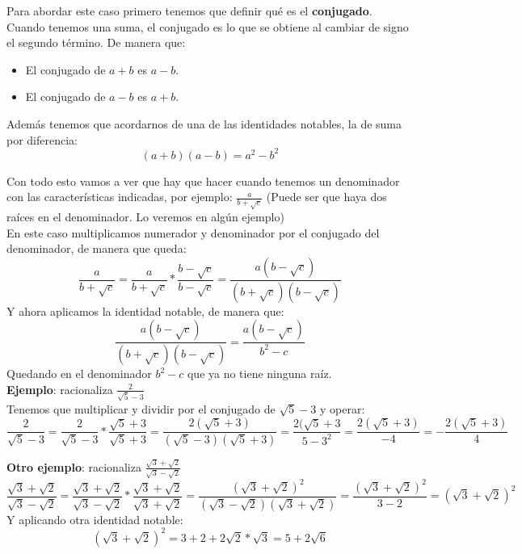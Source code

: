 \documentclass[a4paper,11pt,answers]{exam}
\begin{document}
Para abordar este caso primero tenemos que definir qué es el \textbf{conjugado}.\\
Cuando tenemos una suma, el conjugado es lo que se obtiene al cambiar de signo el segundo término. De manera que:
\begin{itemize}
	\item El conjugado de $a+b$ es $a-b$.
	\item El conjugado de $a-b$ es $a+b$.
\end{itemize}

Además tenemos que acordarnos de una de las identidades notables, la de suma por diferencia:
\[(a+b)(a-b) = a^2 - b^2\]

Con todo esto vamos a ver que hay que hacer cuando tenemos un denominador con las características indicadas, por ejemplo: $\frac{a}{b + \sqrt{c}}$ (Puede ser que haya dos raíces en el denominador. Lo veremos en algún ejemplo)\\
En este caso multiplicamos numerador y denominador por el conjugado del denominador, de manera que queda:
\[\frac{a}{b + \sqrt{c}} = \frac{a}{b + \sqrt{c}} * \frac{b-\sqrt{c}}{b-\sqrt{c}} = \frac{a(b-\sqrt{c})}{(b+\sqrt{c})(b-\sqrt{c})}\]
Y ahora aplicamos la identidad notable, de manera que:
\[\frac{a(b-\sqrt{c})}{(b+\sqrt{c})(b-\sqrt{c})} = \frac{a(b-\sqrt{c})}{b^2 - c}\]
Quedando en el denominador $b^2 - c$ que ya no tiene ninguna raíz.\\

\textbf{Ejemplo}: racionaliza $\frac{2}{\sqrt{5} - 3}$\\
Tenemos que multiplicar y dividir por el conjugado de $\sqrt{5} - 3$ y operar:
\[\frac{2}{\sqrt{5} - 3} = \frac{2}{\sqrt{5} - 3}* \frac{\sqrt{5} + 3}{\sqrt{5} + 3} =
\frac{2 (\sqrt{5} + 3)}{(\sqrt{5} - 3)(\sqrt{5} + 3)} = \frac{2(\sqrt{5} + 3}{5 - 3^2} = \frac{2(\sqrt{5} + 3)}{-4} = 
- \frac{2(\sqrt{5} + 3)}{4}\]

\textbf{Otro ejemplo}: racionaliza $\frac{\sqrt{3} + \sqrt{2}}{\sqrt{3} - \sqrt{2}}$\\
\[\frac{\sqrt{3} + \sqrt{2}}{\sqrt{3} - \sqrt{2}} = \frac{\sqrt{3} + \sqrt{2}}{\sqrt{3} - \sqrt{2}} * \frac{\sqrt{3} + \sqrt{2}}{\sqrt{3} + \sqrt{2}} = \frac{(\sqrt{3} + \sqrt{2})^2}{(\sqrt{3} - \sqrt{2})(\sqrt{3} + \sqrt{2})} = \frac{(\sqrt{3} + \sqrt{2})^2}{3 -2} =
(\sqrt{3} + \sqrt{2})^2\]
Y aplicando otra identidad notable:
\[(\sqrt{3} + \sqrt{2})^2 = 3 + 2 + 2 \sqrt{2}*\sqrt{3} = 5 + 2\sqrt{6}\]
\end{document}
